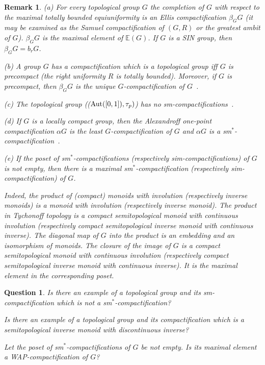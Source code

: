\documentclass{amsart}
\newtheorem{que}[thm]{Question}
\newtheorem{rem}[thm]{Remark}
\newcommand{\aut}{\mbox{{\rm Aut}}}
\begin{document}
\begin{rem}
{\rm (a) For every topo{\rm l}ogica{\rm l} group $G$ the comp{\rm l}etion of $G$ with respect to the maxima{\rm l} tota{\rm ll}y bounded equiuniformity is an E{\rm ll}is compactification $\beta_G G$ (it may be examined as the Samuel compactification of $(G, R)$ or {\it the greatest ambit of $G$}). $\beta_G G$ is the maximal element of $\mathbb{E}(G)$. If $G$ is a SIN group, then  $\beta_G G=b_r G$. 

\medskip

(b) A group $G$ has a compactification which is a topo{\rm l}ogica{\rm l} group iff $G$ is {\it precompact} (the right uniformity $R$ is tota{\rm ll}y bounded). Moreover, if $G$ is {\it precompact}, then $\beta_G G$ is the unique $G$-compactification of $G$~\cite{ChK2}. 

\medskip

(c) The topological group (($\aut ([0, 1]), \tau_p)$) has no sm-compactifications~\cite{Megr2001}.  

\medskip

(d) If $G$ is a locally compact group, then the Alexandroff one-point compactification $\alpha G$ is the least $G$-compactification of $G$ and $\alpha G$ is a sm$^*$-compactification~\cite{Berg}.

\medskip 

(e) If the poset of sm$^*$-compactifications (respectively sim-compactifications) of $G$ is not empty, then there is a maximal sm$^*$-compactification  (respectively sim-compactification) of $G$. 

Indeed, the product of (compact) monoids with involution (respectively inverse monoids) is a monoid with involution (respectively inverse monoid). The product in Tychonoff topology is a compact semitopological monoid with continuous involution (respectively compact semitopological inverse monoid with continuous inverse). The diagonal map of $G$ into the product is an embedding and an isomorphism of monoids. The closure of the image of $G$ is a compact semitopological monoid with continuous involution (respectively compact semitopological inverse monoid with continuous inverse). It is the maximal element in the corresponding poset.}
\end{rem}

\begin{que}
Is there an example of a topological group and its sm-compactification which is not a sm$^*$-compactification? 

Is there an example of a topological group and its compactification which is a semitopological inverse monoid with discontinuous inverse?

Let the poset of sm$^*$-compactifications of $G$ be not empty. Is its maximal element a WAP-compactification of $G$?
\end{que}
\end{document}
